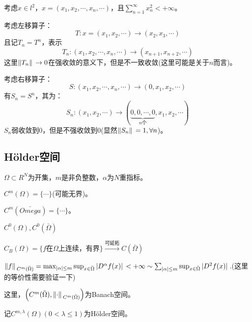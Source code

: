 \begin{example}
    考虑$x\in l^2$，$x=(x_1,x_2,\cdots,x_n,\cdots)$，且$\sum_{n=1}^{\infty}x_n^2<+\infty$。
    \par
    考虑左移算子：
    \begin{equation*}
        T:x=(x_1,x_2,\cdots)\rightarrow (x_2,x_3,\cdots)
    \end{equation*}
    且记$T_n=T^n$，表示
    \begin{equation*}
        T_n:(x_1,x_2,\cdots,x_n,\cdots)\rightarrow (x_{n+1},x_{n+2},\cdots)
    \end{equation*}
    这里$\norm*{T_n}\rightarrow 0$在强收敛的意义下，但是不一致收敛(这里可能是关于$n$而言)。
    \par
    考虑右移算子：
    \begin{equation*}
        S:(x_1,x_2,\cdots,x_n,\cdots)\rightarrow (0,x_1,x_2,\cdots)
    \end{equation*}
    有$S_n=S^n$，其为：
    \begin{equation*}
        S_n:(x_1,x_2,\cdots)\rightarrow (\underbrace{0,0,\cdots,0}_{n\text{个}},x_1,x_2,\cdots)
    \end{equation*}
    $S_n$弱收敛到0，但是不强收敛到0(显然$\norm*{S_n}=1,\forall n$)。
\end{example}

\subsection{H{\"o}lder空间}
$\Omega\subset R^N$为开集，$m$是非负整数，$\alpha$为$N$重指标。
\par
$C^m(\Omega)=\{\cdots\}$(可能无界)。
\par
$C^m(\bar{Omega})=\{\cdots\}$。
\par
$C^0(\Omega),C^0(\bar{\Omega})$
\par
$C_B(\Omega)=\{f\text{在$\Omega$上连续，有界}\}\xrightarrow{\text{可延拓}}C(\bar{\Omega})$
\par
$\norm*{f}_{C^m(\bar{\Omega})}=\max_{\abs*{\alpha}\leq m}\sup_{x\in\bar{\Omega}}\abs*{D^{\alpha}f(x)}<+\infty\sim \sum_{\abs*{\alpha}\leq m}\sup_{x\in \bar{\Omega}}\abs*{D^2f(x)}$.(这里的等价性需要验证一下)
\par
这里，$\left(C^m(\bar{\Omega}),\norm*{\cdot}_{C^m(\bar{\Omega})}\right)$为Banach空间。

\par

记$C^{m,\lambda}(\Omega)(0<\lambda\leq 1)$为H{\"o}lder空间。